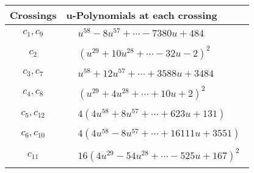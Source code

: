 \documentclass[1p]{elsarticle_modified}
\theoremstyle{definition}
\begin{document}
\begin{tabular}{m{50pt}|m{274pt}}
Crossings & \hspace{64pt}u-Polynomials at each crossing \\
\hline $$\begin{aligned}c_{1},c_{9}\end{aligned}$$&$\begin{aligned}
&u^{58}-8 u^{57}+\cdots-7380 u+484
\end{aligned}$\\
\hline $$\begin{aligned}c_{2}\end{aligned}$$&$\begin{aligned}
&(u^{29}+10 u^{28}+\cdots-32 u-2)^{2}
\end{aligned}$\\
\hline $$\begin{aligned}c_{3},c_{7}\end{aligned}$$&$\begin{aligned}
&u^{58}+12 u^{57}+\cdots+3588 u+3484
\end{aligned}$\\
\hline $$\begin{aligned}c_{4},c_{8}\end{aligned}$$&$\begin{aligned}
&(u^{29}+4 u^{28}+\cdots+10 u+2)^{2}
\end{aligned}$\\
\hline $$\begin{aligned}c_{5},c_{12}\end{aligned}$$&$\begin{aligned}
&4(4 u^{58}+8 u^{57}+\cdots+623 u+131)
\end{aligned}$\\
\hline $$\begin{aligned}c_{6},c_{10}\end{aligned}$$&$\begin{aligned}
&4(4 u^{58}-8 u^{57}+\cdots+16111 u+3551)
\end{aligned}$\\
\hline $$\begin{aligned}c_{11}\end{aligned}$$&$\begin{aligned}
&16(4 u^{29}-54 u^{28}+\cdots-525 u+167)^{2}
\end{aligned}$\\
\hline
\end{tabular}\\~\\
\end{document}
